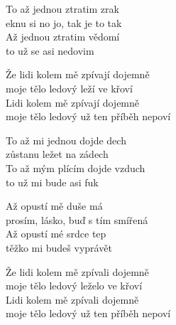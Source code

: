 
\ve{}
To až jednou ztratim zrak\\
eknu si no jo, tak je to tak\\
Až jednou ztratim vědomí\\
to už se asi nedovim
 
\cho{}
Že lidi kolem mě zpívají dojemně\\
moje tělo ledový leží ve křoví\\
Lidi kolem mě zpívají dojemně\\
moje tělo ledový už ten příběh nepoví
 
\ve{}
To až mi jednou dojde dech\\
zůstanu ležet na zádech\\
To až mým plícím dojde vzduch\\
to už mi bude asi fuk

\cho{}

\ve{}
Až opustí mě duše má\\
prosím, lásko, buď s tím smířená\\
Až opustí mé srdce tep\\
těžko mi budeš vyprávět
 
\cho{}
Že lidi kolem mě zpívali dojemně\\
moje tělo ledový leželo ve křoví\\
Lidi kolem mě zpívali dojemně\\
moje tělo ledový už ten příběh nepoví

\esong{}
